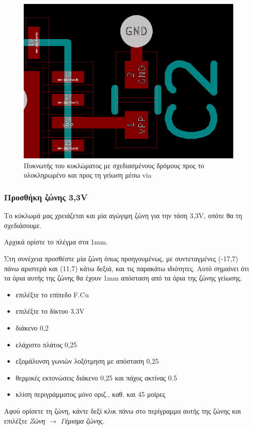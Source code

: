 \documentclass[a4paper]{article}
\begin{document}
\begin{figure}
  \begin{center}
    \includegraphics[width=.5\textwidth]{img/pcb-circ-track.png}
    \caption{Πυκνωτής του κυκλώματος με σχεδιασμένους δρόμους προς το ολοκληρωμένο και προς τη γείωση μέσω via}
    \label{fig:pcb-circ-track}
  \end{center}
\end{figure}


\subsubsection{Προσθήκη ζώνης 3,3V}

Το κύκλωμά μας χρειάζεται και μία αγώγιμη ζώνη για την τάση 3,3V, οπότε θα τη σχεδιάσουμε.

Αρχικά ορίστε το πλέγμα στα 1mm.

Στη συνέχεια προσθέστε μία ζώνη όπως προηγουμένως, με συντεταγμένες (-17,7) πάνω αριστερά και (11,7) κάτω δεξιά, και τις παρακάτω ιδιότητες. Αυτό σημαίνει ότι τα όρια αυτής της ζώνης θα έχουν 1mm απόσταση από τα όρια της ζώνης γείωσης.

\begin{itemize}
    \item επιλέξτε το επίπεδο F.Cu
    \item επιλέξτε το δίκτυο 3.3V
    \item διάκενο 0,2
    \item ελάχιστο πλάτος 0,25
    \item εξομάλυνση γωνιών λοξότμηση με απόσταση 0,25
    \item θερμικές εκτονώσεις διάκενο 0,25 και πάχος ακτίνας 0.5
    \item κλίση περιγράμματος μόνο οριζ., καθ. και 45 μοίρες
\end{itemize}

Αφού ορίσετε τη ζώνη, κάντε δεξί κλικ πάνω στο περίγραμμα αυτής της ζώνης και επιλέξτε \textit{Ζώνη $\rightarrow$ Γέμισμα ζώνης}.
\end{document}
